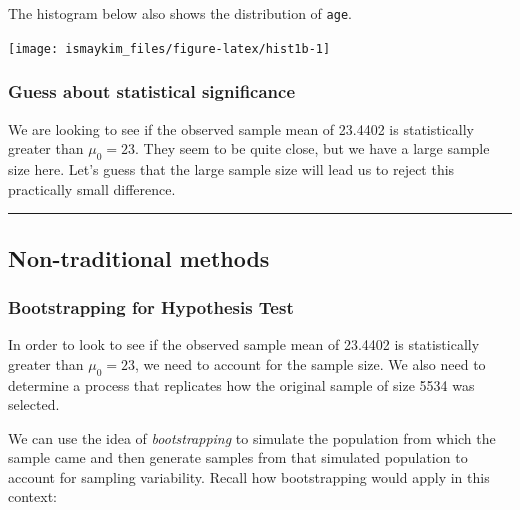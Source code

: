 \documentclass[]{tufte-book}
\newenvironment{Shaded}{\begin{snugshade}}{\end{snugshade}}
\newcommand{\KeywordTok}[1]{\textcolor[rgb]{0.13,0.29,0.53}{\textbf{{#1}}}}
\newcommand{\DataTypeTok}[1]{\textcolor[rgb]{0.13,0.29,0.53}{{#1}}}
\newcommand{\DecValTok}[1]{\textcolor[rgb]{0.00,0.00,0.81}{{#1}}}
\newcommand{\StringTok}[1]{\textcolor[rgb]{0.31,0.60,0.02}{{#1}}}
\newcommand{\NormalTok}[1]{{#1}}
\let\oldrule=\rule
\renewcommand{\rule}[1]{\oldrule{\linewidth}}
\begin{document}
The histogram below also shows the distribution of \texttt{age}.

\begin{Shaded}
\end{Shaded}

\begin{center}\texttt{[image: ismaykim\_files/figure-latex/hist1b-1]} \end{center}

\subsubsection{Guess about statistical
significance}\label{guess-about-statistical-significance}

We are looking to see if the observed sample mean of 23.4402 is
statistically greater than \(\mu_0 = 23\). They seem to be quite close,
but we have a large sample size here. Let's guess that the large sample
size will lead us to reject this practically small difference.

\begin{center}\rule{0.5\linewidth}{\linethickness}\end{center}

\subsection{Non-traditional methods}\label{non-traditional-methods}

\subsubsection{Bootstrapping for Hypothesis
Test}\label{bootstrapping-for-hypothesis-test}

In order to look to see if the observed sample mean of 23.4402 is
statistically greater than \(\mu_0 = 23\), we need to account for the
sample size. We also need to determine a process that replicates how the
original sample of size 5534 was selected.

We can use the idea of \emph{bootstrapping} to simulate the population
from which the sample came and then generate samples from that simulated
population to account for sampling variability. Recall how bootstrapping
would apply in this context:
\end{document}

